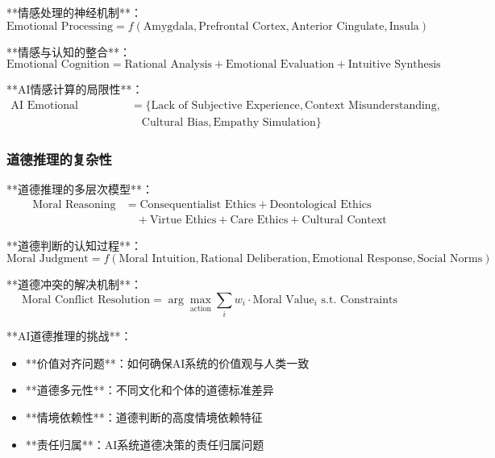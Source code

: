 **情感处理的神经机制**：
\begin{equation}
\text{Emotional Processing} = f(\text{Amygdala}, \text{Prefrontal Cortex}, \text{Anterior Cingulate}, \text{Insula})
\end{equation}

**情感与认知的整合**：
\begin{equation}
\text{Emotional Cognition} = \text{Rational Analysis} + \text{Emotional Evaluation} + \text{Intuitive Synthesis}
\end{equation}

**AI情感计算的局限性**：
\begin{align}
\text{AI Emotional Limitations} &= \{\text{Lack of Subjective Experience}, \text{Context Misunderstanding}, \\
&\quad \text{Cultural Bias}, \text{Empathy Simulation}\}
\end{align}

\subsubsection{道德推理的复杂性} %

**道德推理的多层次模型**：
\begin{align}
\text{Moral Reasoning} &= \text{Consequentialist Ethics} + \text{Deontological Ethics} \\
&\quad + \text{Virtue Ethics} + \text{Care Ethics} + \text{Cultural Context}
\end{align}

**道德判断的认知过程**：
\begin{equation}
\text{Moral Judgment} = f(\text{Moral Intuition}, \text{Rational Deliberation}, \text{Emotional Response}, \text{Social Norms})
\end{equation}

**道德冲突的解决机制**：
\begin{equation}
\text{Moral Conflict Resolution} = \arg\max_{\text{action}} \sum_{i} w_i \cdot \text{Moral Value}_i \text{ s.t. } \text{Constraints}
\end{equation}

**AI道德推理的挑战**：
\begin{itemize}
\item **价值对齐问题**：如何确保AI系统的价值观与人类一致
\item **道德多元性**：不同文化和个体的道德标准差异
\item **情境依赖性**：道德判断的高度情境依赖特征
\item **责任归属**：AI系统道德决策的责任归属问题
\end{itemize}

